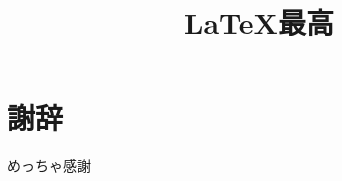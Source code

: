 \documentclass[a4jsme, fleqn]{jsmepaper}
\title{\LaTeX 最高}
\def\biblio{\def\newblock{\hskip .11em plus .33em minus .07em}\renewcommand{\refname}{文献}\nocite{*}}
\begin{document}
\def\biblio{}
\maketitle
\thispagestyle{empty}

\thispagestyle{fancy}






\clearpage





\def\newblock{\hskip .11em plus .33em minus .07em}
\renewcommand{\refname}{文献}
\nocite{*}




\section*{謝辞}
めっちゃ感謝
\vspace{1cm} 
\end{document}
